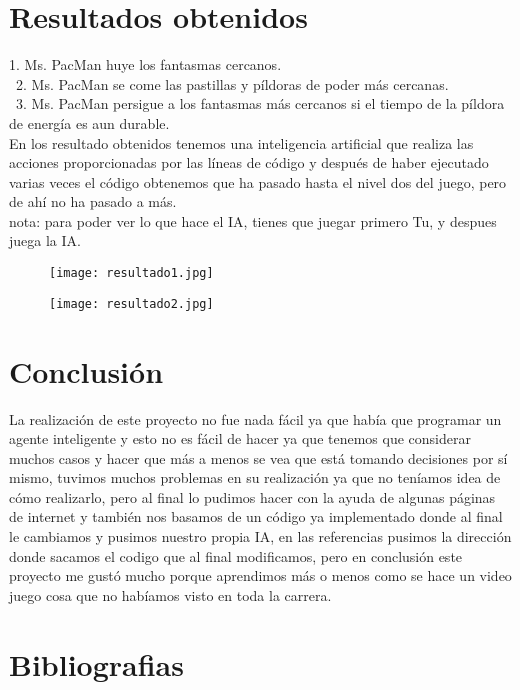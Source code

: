 \documentclass[11pt]{article}
\begin{document}
\newpage

\section{Resultados obtenidos}

1. Ms. PacMan huye los fantasmas cercanos.\\\
2. Ms. PacMan se come las pastillas y píldoras de poder más cercanas.\\\
3. Ms. PacMan persigue a los fantasmas más cercanos si el tiempo de la     píldora de energía es aun durable.\\
\linebreak
En los resultado obtenidos tenemos una inteligencia artificial que realiza las acciones proporcionadas por las líneas de código y después de haber ejecutado varias veces el código obtenemos que ha pasado hasta el nivel dos del juego, pero de ahí no ha pasado a más.\\
nota: para poder ver lo que hace el IA, tienes que juegar primero Tu, y despues juega la IA.\\
\linebreak
\begin{figure}[h]
\texttt{[image: resultado1.jpg]}
\centering
\end{figure}
\linebreak
\begin{figure}[h]
\texttt{[image: resultado2.jpg]}
\centering
\end{figure}

\newpage
\section{Conclusión}
La realización de este proyecto no fue nada fácil ya que había que programar un agente inteligente y esto no es fácil de hacer ya que tenemos que considerar muchos casos y hacer que más a menos se vea que está tomando decisiones por sí mismo, tuvimos muchos problemas en su realización ya que no teníamos idea de cómo realizarlo, pero al final lo pudimos hacer con la ayuda de algunas páginas de internet y también nos basamos de un código ya implementado donde al final le cambiamos y pusimos nuestro propia IA, en las referencias pusimos la dirección donde sacamos el codigo que al final modificamos, pero en conclusión este proyecto me gustó mucho porque aprendimos más o menos como se hace un video juego cosa que no habíamos visto en toda la carrera.

\section{Bibliografias}


\end{document}
